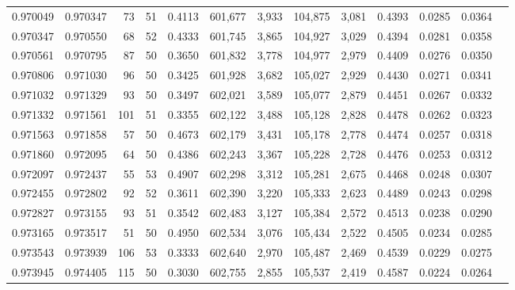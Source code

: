 \begin{tabular}{rrrrrrrrrrrrr}
0.970049 & 0.970347 &    73 &  51 &                                     0.4113 & 601,677 &   3,933 & 104,875 &   3,081 & 0.4393 & 0.0285 & 0.0364 \\
0.970347 & 0.970550 &    68 &  52 &                                     0.4333 & 601,745 &   3,865 & 104,927 &   3,029 & 0.4394 & 0.0281 & 0.0358 \\
0.970561 & 0.970795 &    87 &  50 &                                     0.3650 & 601,832 &   3,778 & 104,977 &   2,979 & 0.4409 & 0.0276 & 0.0350 \\
0.970806 & 0.971030 &    96 &  50 &                                     0.3425 & 601,928 &   3,682 & 105,027 &   2,929 & 0.4430 & 0.0271 & 0.0341 \\
0.971032 & 0.971329 &    93 &  50 &                                     0.3497 & 602,021 &   3,589 & 105,077 &   2,879 & 0.4451 & 0.0267 & 0.0332 \\
0.971332 & 0.971561 &   101 &  51 &                                     0.3355 & 602,122 &   3,488 & 105,128 &   2,828 & 0.4478 & 0.0262 & 0.0323 \\
0.971563 & 0.971858 &    57 &  50 &                                     0.4673 & 602,179 &   3,431 & 105,178 &   2,778 & 0.4474 & 0.0257 & 0.0318 \\
0.971860 & 0.972095 &    64 &  50 &                                     0.4386 & 602,243 &   3,367 & 105,228 &   2,728 & 0.4476 & 0.0253 & 0.0312 \\
0.972097 & 0.972437 &    55 &  53 &                                     0.4907 & 602,298 &   3,312 & 105,281 &   2,675 & 0.4468 & 0.0248 & 0.0307 \\
0.972455 & 0.972802 &    92 &  52 &                                     0.3611 & 602,390 &   3,220 & 105,333 &   2,623 & 0.4489 & 0.0243 & 0.0298 \\
0.972827 & 0.973155 &    93 &  51 &                                     0.3542 & 602,483 &   3,127 & 105,384 &   2,572 & 0.4513 & 0.0238 & 0.0290 \\
0.973165 & 0.973517 &    51 &  50 &                                     0.4950 & 602,534 &   3,076 & 105,434 &   2,522 & 0.4505 & 0.0234 & 0.0285 \\
0.973543 & 0.973939 &   106 &  53 &                                     0.3333 & 602,640 &   2,970 & 105,487 &   2,469 & 0.4539 & 0.0229 & 0.0275 \\
0.973945 & 0.974405 &   115 &  50 &                                     0.3030 & 602,755 &   2,855 & 105,537 &   2,419 & 0.4587 & 0.0224 & 0.0264 \\

\end{tabular}
